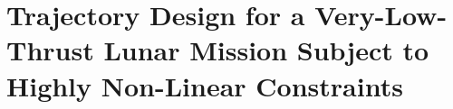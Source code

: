 \documentclass[12pt,a4paper]{report}
\begin{document}
\section*{Trajectory Design for a Very-Low-Thrust Lunar Mission Subject to Highly Non-Linear Constraints}

\end{document}
